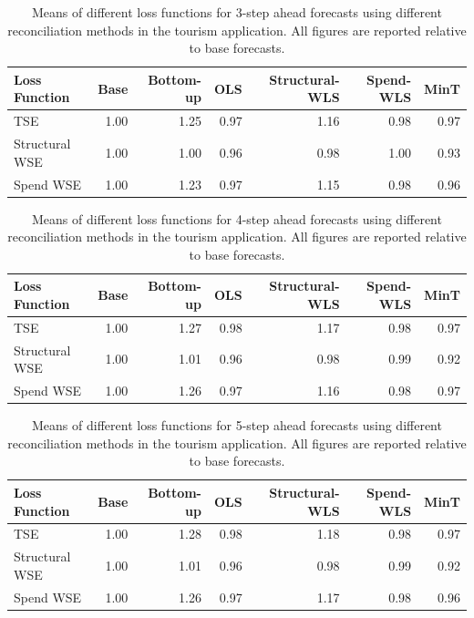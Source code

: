 \documentclass[12pt]{article}
\begin{document}
  	\begin{table}[ht]
  		\centering
  		\begin{tabular}{lrrrrrr}
  			\hline
  			Loss Function & Base & Bottom-up & OLS & Structural-WLS & Spend-WLS & MinT \\
  			\hline
  			TSE & 1.00 & 1.25 & 0.97 & 1.16 & 0.98 & 0.97 \\
  			Structural WSE & 1.00 & 1.00 & 0.96 & 0.98 & 1.00 & 0.93 \\
  			Spend WSE & 1.00 & 1.23 & 0.97 & 1.15 & 0.98 & 0.96 \\
  			\hline
  		\end{tabular}
  		\caption{Means of different loss functions for 3-step ahead forecasts using different reconciliation methods in the tourism application.  All figures are reported relative to base forecasts.}
  	\end{table}
  	
  	\begin{table}[ht]
  		\centering
  		\begin{tabular}{lrrrrrr}
  			\hline
  			Loss Function & Base & Bottom-up & OLS & Structural-WLS & Spend-WLS & MinT \\
  			\hline
  			TSE & 1.00 & 1.27 & 0.98 & 1.17 & 0.98 & 0.97 \\
  			Structural WSE & 1.00 & 1.01 & 0.96 & 0.98 & 0.99 & 0.92 \\
  			Spend WSE & 1.00 & 1.26 & 0.97 & 1.16 & 0.98 & 0.97 \\
  			\hline
  		\end{tabular}
  		\caption{Means of different loss functions for 4-step ahead forecasts using different reconciliation methods in the tourism application.  All figures are reported relative to base forecasts.}
  	\end{table}

  \begin{table}[ht]
  	\centering
  	\begin{tabular}{lrrrrrr}
  		\hline
  		Loss Function & Base & Bottom-up & OLS & Structural-WLS & Spend-WLS & MinT \\
  		\hline
  		TSE & 1.00 & 1.28 & 0.98 & 1.18 & 0.98 & 0.97 \\
  		Structural WSE & 1.00 & 1.01 & 0.96 & 0.98 & 0.99 & 0.92 \\
  		Spend WSE & 1.00 & 1.26 & 0.97 & 1.17 & 0.98 & 0.96 \\
  		\hline
  	\end{tabular}
  	\caption{Means of different loss functions for 5-step ahead forecasts using different reconciliation methods in the tourism application.  All figures are reported relative to base forecasts.}
  \end{table}
\end{document}
